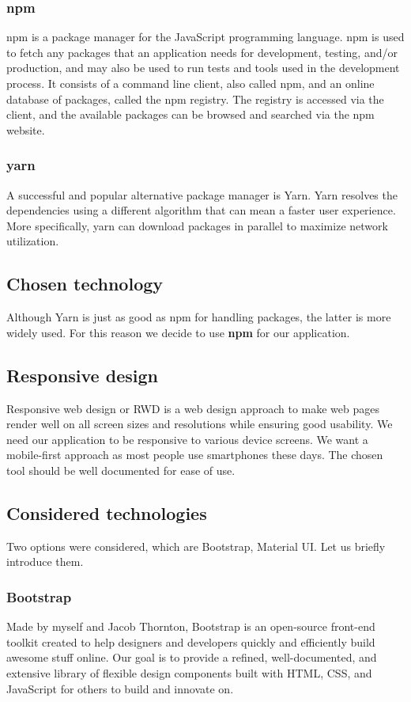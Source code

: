 \subsubsection*{npm}
npm is a package manager for the JavaScript programming language.
npm is used to fetch any packages that an application needs for development, testing, and/or production, and may also be used to run tests and tools used in the development process.
It consists of a command line client, also called npm, and an online database of packages, called the npm registry. 
The registry is accessed via the client, and the available packages can be browsed and searched via the npm website.

\subsubsection*{yarn}
A successful and popular alternative package manager is Yarn. 
Yarn resolves the dependencies using a different algorithm that can mean a faster user experience.
More specifically, yarn can download packages in parallel to maximize network utilization.

\subsection*{Chosen technology}
Although Yarn is just as good as npm for handling packages, the latter is more widely used.
For this reason we decide to use \textbf{npm} for our application. 

\subsection{Responsive design}
Responsive web design or RWD is a web design approach to make web pages render well on all screen sizes and resolutions while ensuring good usability.
We need our application to be responsive to various device screens.
We want a mobile-first approach as most people use smartphones these days.
The chosen tool should be well documented for ease of use.

\subsection*{Considered technologies}
Two options were considered, which are Bootstrap, Material UI.
Let us briefly introduce them.

\subsubsection*{Bootstrap}
Made by myself and Jacob Thornton, Bootstrap is an open-source front-end toolkit created to help designers and developers quickly and efficiently build awesome stuff online. Our goal is to provide a refined, well-documented, and extensive library of flexible design components built with HTML, CSS, and JavaScript for others to build and innovate on.

